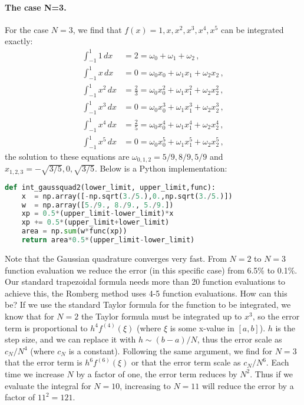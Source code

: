 \documentclass[graybox,sectrefs,envcountresetchap,open=right,final]{svmonodo}
\begin{document}
\paragraph{The case N=3.}
For the case $N=3$, we find that $f(x)=1,x,x^2,x^3,x^4,x^5$ can be integrated exactly:
\begin{align}
\int_{-1}^{1}1\,dx&=2=\omega_0+\omega_1+\omega_2\,,\\ 
\int_{-1}^{1}x\,dx&=0=\omega_0x_0+\omega_1x_1+\omega_2x_2\,,\\ 
\int_{-1}^{1}x^2\,dx&=\frac{2}{3}=\omega_0x_0^2+\omega_1x_1^2+\omega_2x_2^2\,,\\ 
\int_{-1}^{1}x^3\,dx&=0=\omega_0x_0^3+\omega_1x_1^3+\omega_2x_2^3\,,\\ 
\int_{-1}^{1}x^4\,dx&=\frac{2}{5}=\omega_0x_0^4+\omega_1x_1^4+\omega_2x_2^4\,,\\ 
\int_{-1}^{1}x^5\,dx&=0=\omega_0x_0^5+\omega_1x_1^5+\omega_2x_2^5\,,
\end{align}
the solution to these equations are $\omega_{0,1,2}=5/9, 8/9, 5/9$ and $x_{1,2,3}=-\sqrt{3/5},0,\sqrt{3/5}$. Below is a Python implementation:
\begin{lstlisting}[language=Python,style=blue1]
def int_gaussquad2(lower_limit, upper_limit,func):
    x  = np.array([-np.sqrt(3./5.),0.,np.sqrt(3./5.)])
    w  = np.array([5./9., 8./9., 5./9.])
    xp = 0.5*(upper_limit-lower_limit)*x
    xp += 0.5*(upper_limit+lower_limit)
    area = np.sum(w*func(xp))
    return area*0.5*(upper_limit-lower_limit)
\end{lstlisting}

Note that the Gaussian quadrature converges very fast. From $N=2$ to $N=3$ function evaluation we reduce the error (in this specific case) 
from 6.5\% to 0.1\%. Our standard trapezoidal formula needs more than 20 function evaluations to achieve this, the Romberg method uses 4-5 function
evaluations. How can this be? If we use the standard Taylor formula for the function to be integrated, we know that for $N=2$ the Taylor 
formula must be integrated up to $x^3$, so the error term is proportional to $h^4f^{(4)}(\xi)$ (where $\xi$ is some x-value in $[a,b]$). 
$h$ is the step size, and we can replace it with $h\sim (b-a)/N$, thus the error scale as $c_N/N^4$ (where $c_N$ is a constant). 
Following the same argument, we find for $N=3$ that the error term is $h^6f^{(6)}(\xi)$ or that the error term scale as $c_N/N^6$. 
Each time we increase $N$ by a factor of one, the error term reduces by $N^2$. Thus if we evaluate the integral for $N=10$, 
increasing to $N=11$ will reduce the error by a factor of $11^2=121$.
\end{document}
